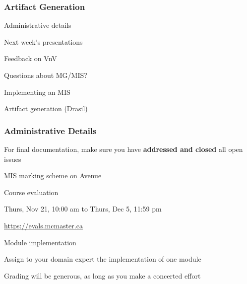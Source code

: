 \documentclass[t,12pt,numbers,fleqn]{beamer}
\begin{document}



\begin{frame}
\frametitle{Artifact Generation}

\bi
\item Administrative details
\item Next week's presentations
\item Feedback on VnV
\item Questions about MG/MIS?
\item Implementing an MIS 
\item Artifact generation (Drasil)
\ei
\end{frame}


\begin{frame}
\frametitle{Administrative Details}

\bi
\item For final documentation, make sure you have \textbf{addressed and closed}
  all open issues
\item MIS marking scheme on Avenue
\item Course evaluation
\bi
\item Thurs, Nov 21, 10:00 am to Thurs, Dec 5, 11:59 pm
\item \url{https://evals.mcmaster.ca}
\ei
\item Module implementation
\bi
\item Assign to your domain expert the implementation of one module
\item Grading will be generous, as long as you make a concerted effort
\ei
\ei

\end{frame}

\end{document}

